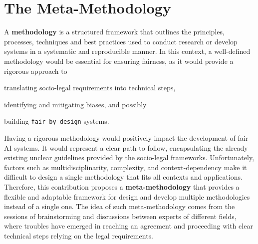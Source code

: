 \documentclass[12pt,a4paper,openright,twoside]{book}
\begin{document}



% 


\chapter{The Meta-Methodology}%
\label{chap:meta-methodology}


A \textbf{methodology} is a structured framework that outlines the principles, processes, techniques and best practices used to conduct research or develop systems in a systematic and reproducible manner.
%
In this context, a well-defined methodology would be essential for ensuring fairness, as it would provide a rigorous approach to
\begin{enumerate*}[label=(\roman*)]
    \item translating socio-legal requirements into technical steps,
    \item identifying and mitigating biases, and possibly
    \item building \texttt{fair-by-design} systems.
\end{enumerate*}

Having a rigorous methodology would positively impact the development of fair \ac{AI} systems.
%
It would represent a clear path to follow, encapsulating the already existing unclear guidelines provided by the socio-legal frameworks.
Unfortunately, factors such as multidisciplinarity, complexity, and context-dependency make it difficult to design a single methodology that fits all contexts and applications.
%
Therefore, this contribution proposes a \textbf{meta-methodology} that provides a flexible and adaptable framework for design and develop multiple methodologies instead of a single one.
%
The idea of such meta-methodology comes from the sessions of brainstorming and discussions between experts of different fields, where troubles have emerged in reaching an agreement and proceeding with clear technical steps relying on the legal requirements.
\end{document}
